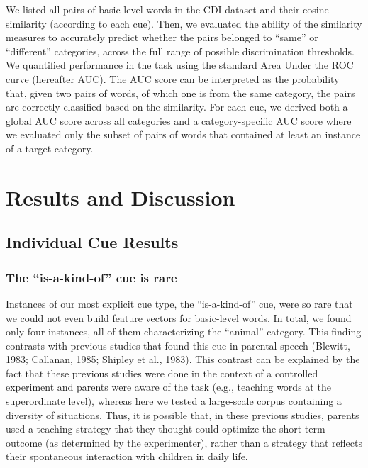 \documentclass[10pt, letterpaper]{article}
\begin{document}
We listed all pairs of basic-level words in the CDI dataset and their
cosine similarity (according to each cue). Then, we evaluated the
ability of the similarity measures to accurately predict whether the
pairs belonged to ``same'' or ``different'' categories, across the full
range of possible discrimination thresholds. We quantified performance
in the task using the standard Area Under the ROC curve (hereafter AUC).
The AUC score can be interpreted as the probability that, given two
pairs of words, of which one is from the same category, the pairs are
correctly classified based on the similarity. For each cue, we derived
both a global AUC score across all categories and a category-specific
AUC score where we evaluated only the subset of pairs of words that
contained at least an instance of a target category.

\hypertarget{results-and-discussion}{%
\section{Results and Discussion}\label{results-and-discussion}}

\hypertarget{individual-cue-results}{%
\subsection{Individual Cue Results}\label{individual-cue-results}}

\hypertarget{the-is-a-kind-of-cue-is-rare}{%
\subsubsection{The ``is-a-kind-of'' cue is
rare}\label{the-is-a-kind-of-cue-is-rare}}

Instances of our most explicit cue type, the ``is-a-kind-of'' cue, were
so rare that we could not even build feature vectors for basic-level
words. In total, we found only four instances, all of them
characterizing the ``animal'' category. This finding contrasts with
previous studies that found this cue in parental speech (Blewitt, 1983;
Callanan, 1985; Shipley et al., 1983). This contrast can be explained by
the fact that these previous studies were done in the context of a
controlled experiment and parents were aware of the task (e.g., teaching
words at the superordinate level), whereas here we tested a large-scale
corpus containing a diversity of situations. Thus, it is possible that,
in these previous studies, parents used a teaching strategy that they
thought could optimize the short-term outcome (as determined by the
experimenter), rather than a strategy that reflects their spontaneous
interaction with children in daily life.
\end{document}

